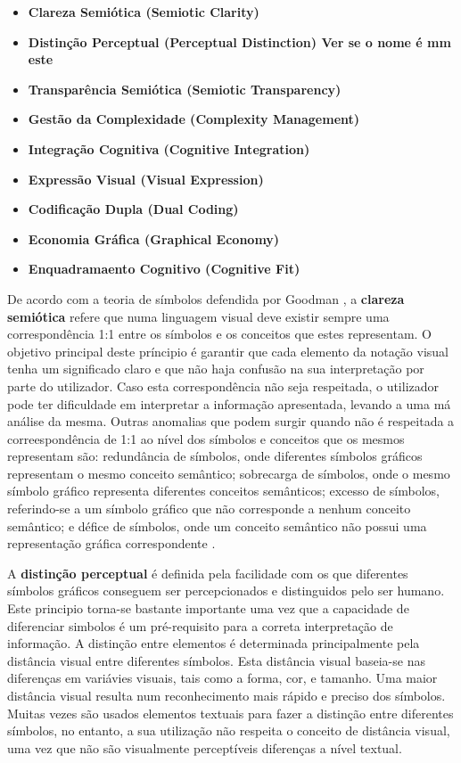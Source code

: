 \begin{itemize}
  \item \textbf{Clareza Semiótica (Semiotic Clarity)}
  \item \textbf{Distinção Perceptual (Perceptual Distinction) Ver se o nome é mm este}
  \item \textbf{Transparência Semiótica (Semiotic Transparency)}
  \item \textbf{Gestão da Complexidade (Complexity Management)}
  \item \textbf{Integração Cognitiva (Cognitive Integration)}
  \item \textbf{Expressão Visual (Visual Expression)}
  \item \textbf{Codificação Dupla (Dual Coding)}
  \item \textbf{Economia Gráfica (Graphical Economy)}
  \item \textbf{Enquadramaento Cognitivo (Cognitive Fit)}
\end{itemize}

De acordo com a teoria de símbolos defendida por Goodman \cite{goodman1976languages}, a \textbf{clareza semiótica} refere que numa linguagem visual deve existir sempre uma correspondência 1:1 entre os símbolos e os conceitos que estes representam. O objetivo principal deste príncipio é garantir que cada elemento da notação visual tenha um significado claro e que não haja confusão na sua interpretação por parte do utilizador. Caso esta correspondência não seja respeitada, o utilizador pode ter dificuldade em interpretar a informação apresentada, levando a uma má análise da mesma. Outras anomalias que podem surgir quando não é respeitada a correespondência de 1:1 ao nível dos símbolos e conceitos que os mesmos representam são: redundância de símbolos, onde diferentes símbolos gráficos representam o mesmo conceito semântico; sobrecarga de símbolos, onde o mesmo símbolo gráfico representa diferentes conceitos semânticos; excesso de símbolos, referindo-se a um símbolo gráfico que não corresponde a nenhum conceito semântico; e défice de símbolos, onde um conceito semântico não possui uma representação gráfica correspondente \cite{moody2009physics}.

A \textbf{distinção perceptual} é definida pela facilidade com os que diferentes símbolos gráficos conseguem ser percepcionados e distinguidos pelo ser humano. Este principio torna-se bastante importante uma vez que a capacidade de diferenciar simbolos é um pré-requisito para a correta interpretação de informação. A distinção entre elementos é determinada principalmente pela distância visual entre diferentes símbolos. Esta distância visual baseia-se nas diferenças em variávies visuais, tais como a forma, cor, e tamanho. Uma maior distância visual resulta num reconhecimento mais rápido e preciso dos símbolos. Muitas vezes são usados elementos textuais para fazer a distinção entre diferentes símbolos, no entanto, a sua utilização não respeita o conceito de distância visual, uma vez que não são visualmente perceptíveis diferenças a nível textual.

